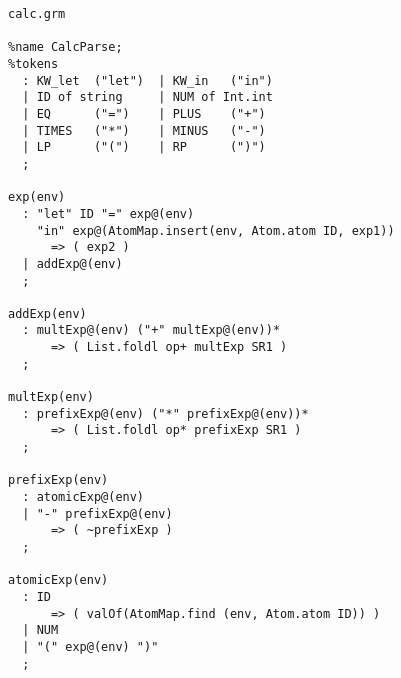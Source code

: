 \begin{verbatim}
calc.grm

%name CalcParse;
%tokens
  : KW_let  ("let")  | KW_in   ("in")
  | ID of string     | NUM of Int.int
  | EQ      ("=")    | PLUS    ("+")
  | TIMES   ("*")    | MINUS   ("-")
  | LP      ("(")    | RP      (")")
  ;

exp(env)
  : "let" ID "=" exp@(env) 
    "in" exp@(AtomMap.insert(env, Atom.atom ID, exp1))
      => ( exp2 )
  | addExp@(env)
  ;

addExp(env)
  : multExp@(env) ("+" multExp@(env))*
      => ( List.foldl op+ multExp SR1 )
  ;

multExp(env)
  : prefixExp@(env) ("*" prefixExp@(env))*
      => ( List.foldl op* prefixExp SR1 )
  ;

prefixExp(env)
  : atomicExp@(env)
  | "-" prefixExp@(env)
      => ( ~prefixExp )
  ;

atomicExp(env)
  : ID  
      => ( valOf(AtomMap.find (env, Atom.atom ID)) )
  | NUM
  | "(" exp@(env) ")"
  ;
\end{verbatim}
